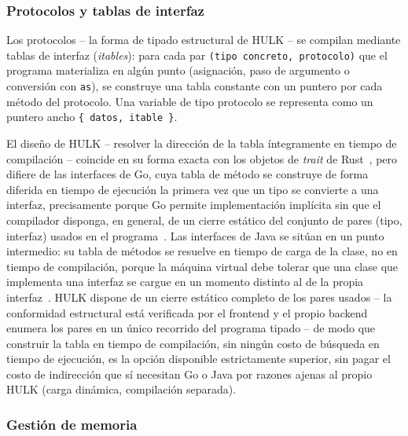 \documentclass[12pt, a4paper]{article}
\begin{document}
\subsubsection{Protocolos y tablas de interfaz}

Los protocolos -- la forma de tipado estructural de HULK -- se compilan
mediante tablas de interfaz (\textit{itables}): para cada par
\texttt{(tipo concreto, protocolo)} que el programa materializa en algún punto
(asignación, paso de argumento o conversión con \texttt{as}), se construye una
tabla constante con un puntero por cada método del protocolo. Una variable de
tipo protocolo se representa como un puntero ancho \texttt{\{ datos, itable \}}.

El diseño de HULK -- resolver la dirección de la tabla íntegramente en tiempo
de compilación -- coincide en su forma exacta con los objetos de \textit{trait}
de Rust~\cite{klabnik2019}, pero difiere de las interfaces de Go, cuya tabla de
método se construye de forma diferida en tiempo de ejecución la primera vez que
un tipo se convierte a una interfaz, precisamente porque Go permite
implementación implícita sin que el compilador disponga, en general, de un
cierre estático del conjunto de pares (tipo, interfaz) usados en el
programa~\cite{donovan2015}. Las interfaces de Java se sitúan en un punto
intermedio: su tabla de métodos se resuelve en tiempo de carga de la clase, no
en tiempo de compilación, porque la máquina virtual debe tolerar que una clase
que implementa una interfaz se cargue en un momento distinto al de la propia
interfaz~\cite{gosling2021}. HULK dispone de un cierre estático completo de los
pares usados -- la conformidad estructural está verificada por el frontend y
el propio backend enumera los pares en un único recorrido del programa tipado
-- de modo que construir la tabla en tiempo de compilación, sin ningún costo
de búsqueda en tiempo de ejecución, es la opción disponible estrictamente
superior, sin pagar el costo de indirección que sí necesitan Go o Java por
razones ajenas al propio HULK (carga dinámica, compilación separada).

\subsubsection{Gesti\'{o}n de memoria}
\end{document}
